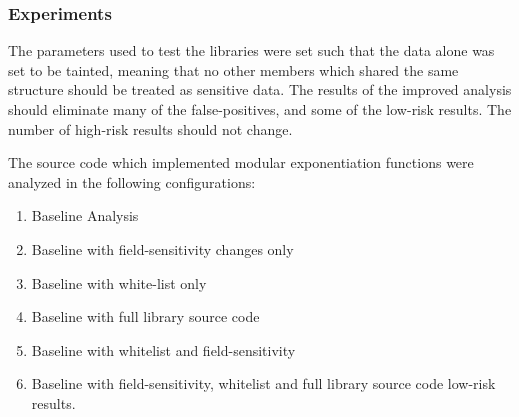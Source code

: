 \subsubsection{Experiments}
The parameters used to test the libraries were set such that the data alone was
set to be tainted, meaning that no other members which shared the same structure
should be treated as sensitive data. The results of the improved analysis should
eliminate many of the false-positives, and some of the low-risk results. The
number of high-risk results should not change.

The source code which implemented modular exponentiation functions were analyzed in the
following configurations:
\begin{enumerate}
\item Baseline Analysis
\item Baseline with field-sensitivity changes only
\item Baseline with white-list only
\item Baseline with full library source code
\item Baseline with whitelist and field-sensitivity
\item Baseline with field-sensitivity, whitelist and full library source code
low-risk results.
\end{enumerate}



